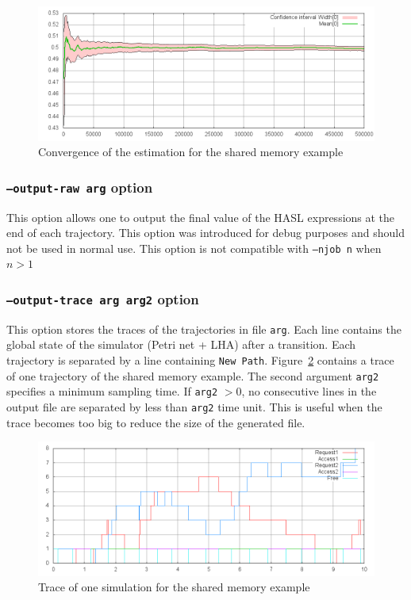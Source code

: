 \documentclass{article}
\begin{document}
\begin{figure}[h]
  \centering
  \includegraphics[width=1.01\textwidth]{figures/convergence.png}
  \caption{Convergence of the estimation for the shared memory example}
  \label{fig:convergence}
\end{figure}

\subsubsection{\texttt{--output-raw arg} option}
This option allows one to output the final value of the HASL
expressions at the end of each trajectory. This option was introduced
for debug purposes and should not be used in normal use. This option
is not compatible with \texttt{--njob n} when $n>1$

\subsubsection{\texttt{--output-trace arg arg2} option}
This option stores the traces of the trajectories in file
\texttt{arg}.  Each line contains the global state of the simulator
(Petri net + LHA) after a transition.  Each trajectory is separated by
a line containing \texttt{New Path}.  Figure~\ref{fig:trace} contains
a trace of one trajectory of the shared memory example.  The second
argument \texttt{arg2} specifies a minimum sampling time. If
\texttt{arg2} $>0$, no consecutive lines in the output file are
separated by less than \texttt{arg2} time unit. This is useful when
the trace becomes too big to reduce the size of the generated file.

\begin{figure}[h]
  \centering
  \includegraphics[width=1.01\textwidth]{figures/trace.png}
  \caption{Trace of one simulation for the shared memory example}
  \label{fig:trace}
\end{figure}
\end{document}
